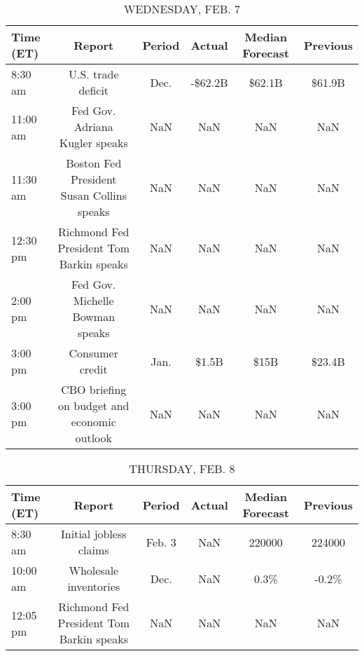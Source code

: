 \documentclass{article}%
\begin{document}
\begin{table}[htbp]%
\caption{WEDNESDAY, FEB. 7}%
\centering%
\begin{adjustbox}{width=1\textwidth}%
\begin{tabular}{lccccc}
\toprule
Time (ET) &                                      Report & Period &  Actual & Median Forecast & Previous \\
\midrule
  8:30 am &                          U.S. trade deficit &   Dec. & -\$62.2B &          \$62.1B &   \$61.9B \\
 11:00 am &              Fed Gov. Adriana Kugler speaks &    NaN &     NaN &             NaN &      NaN \\
 11:30 am &   Boston Fed President Susan Collins speaks &    NaN &     NaN &             NaN &      NaN \\
 12:30 pm &    Richmond Fed President Tom Barkin speaks &    NaN &     NaN &             NaN &      NaN \\
  2:00 pm &             Fed Gov. Michelle Bowman speaks &    NaN &     NaN &             NaN &      NaN \\
  3:00 pm &                             Consumer credit &   Jan. &   \$1.5B &            \$15B &   \$23.4B \\
  3:00 pm & CBO briefing on budget and economic outlook &    NaN &     NaN &             NaN &      NaN \\
\bottomrule
\end{tabular}
%
\end{adjustbox}%
\end{table}

%


\begin{table}[htbp]%
\caption{THURSDAY, FEB. 8}%
\centering%
\begin{adjustbox}{width=1\textwidth}%
\begin{tabular}{lccccc}
\toprule
Time (ET) &                                   Report & Period & Actual & Median Forecast & Previous \\
\midrule
  8:30 am &                   Initial jobless claims & Feb. 3 &    NaN &          220000 &   224000 \\
 10:00 am &                    Wholesale inventories &   Dec. &    NaN &            0.3\% &    -0.2\% \\
 12:05 pm & Richmond Fed President Tom Barkin speaks &    NaN &    NaN &             NaN &      NaN \\
\bottomrule
\end{tabular}
%
\end{adjustbox}%
\end{table}
\end{document}
